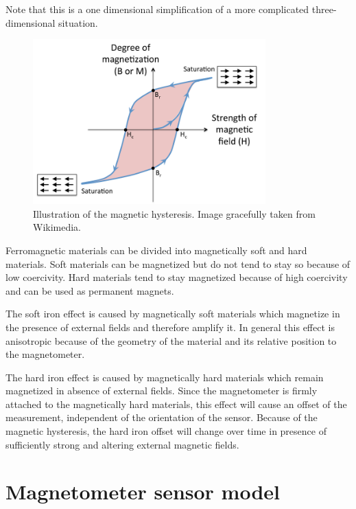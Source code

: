 Note that this is a one dimensional simplification of a more complicated three-dimensional situation.

\begin{figure}[hbt!]
    \centering
    \includegraphics[width=0.8\textwidth]{figures/magnetic_hysteresis.png}
    \caption{Illustration of the magnetic hysteresis. Image gracefully taken from Wikimedia.\cite{wikimedia_hysteresis_image}}
    \label{fig:magnetic_hysteresis}
\end{figure}

Ferromagnetic materials can be divided into magnetically soft and hard materials. Soft materials can be magnetized but do not tend to stay so because of low coercivity. Hard materials tend to stay magnetized because of high coercivity and can be used as permanent magnets.

The soft iron effect is caused by magnetically soft materials which magnetize in the presence of external fields and therefore amplify it. In general this effect is anisotropic because of the geometry of the material and its relative position to the magnetometer.

The hard iron effect is caused by magnetically hard materials which remain magnetized in absence of external fields. Since the magnetometer is firmly attached to the magnetically hard materials, this effect will cause an offset of the measurement, independent of the orientation of the sensor. Because of the magnetic hysteresis, the hard iron offset will change over time in presence of sufficiently strong and altering external magnetic fields.

\section{Magnetometer sensor model}

